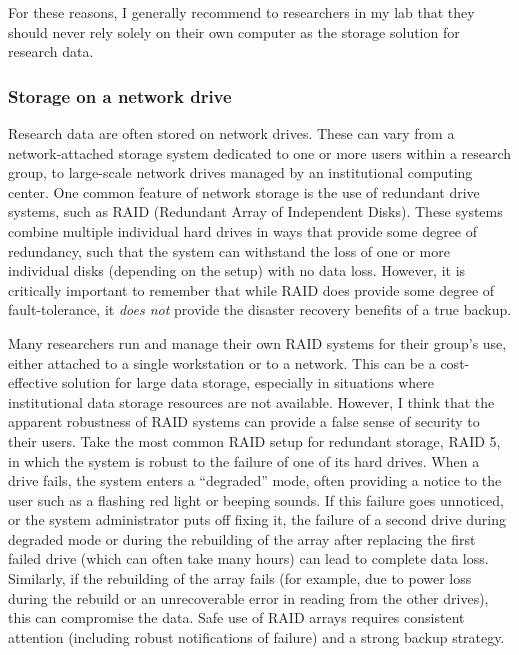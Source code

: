 For these reasons, I generally recommend to researchers in my lab that they should never rely solely on their own computer as the storage solution for research data.

\subsubsection{Storage on a network drive}

Research data are often stored on network drives.  These can vary from a network-attached storage system dedicated to one or more users within a research group, to large-scale network drives managed by an institutional computing center.  One common feature of network storage is the use of redundant drive systems, such as RAID (Redundant Array of Independent Disks). These systems combine multiple individual hard drives in ways that provide some degree of redundancy, such that the system can withstand the loss of one or more individual disks (depending on the setup) with no data loss.  However, it is critically important to remember that while RAID does provide some degree of fault-tolerance, it \textit{does not} provide the disaster recovery benefits of a true backup.

Many researchers run and manage their own RAID systems for their group's use, either attached to a single workstation or to a network.  This can be a cost-effective solution for large data storage, especially in situations where institutional data storage resources are not available.  However, I think that the apparent robustness of RAID systems can provide a false sense of security to their users.  Take the most common RAID setup for redundant storage, RAID 5, in which the system is robust to the failure of one of its hard drives.  When a drive fails, the system enters a ``degraded'' mode, often providing a notice to the user such as a flashing red light or beeping sounds.  If this failure goes unnoticed, or the system administrator puts off fixing it, the failure of a second drive during degraded mode or during the rebuilding of the array after replacing the first failed drive (which can often take many hours) can lead to complete data loss.  Similarly, if the rebuilding of the array fails (for example, due to power loss during the rebuild or an unrecoverable error in reading from the other drives), this can compromise the data. Safe use of RAID arrays requires consistent attention (including robust notifications of failure) and a strong backup strategy.

